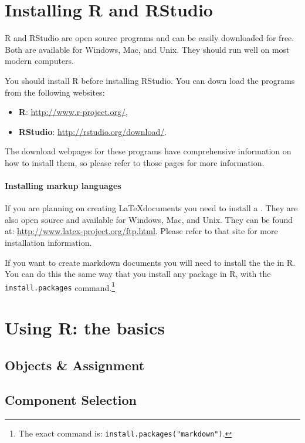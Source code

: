 \documentclass[ChapterTOCs,krantz1]{krantz}\usepackage{graphicx, color}
\begin{document}
\section{Installing R and RStudio}

R and RStudio are open source programs and can be easily downloaded for free. Both are available for Windows, Mac, and Unix. They should run well on most modern computers. 

You should install R before installing RStudio. You can down load the programs from the following websites:

\begin{itemize}
    \item {\bf{R}}: \url{http://www.r-project.org/},
    \item {\bf{RStudio}}: \url{http://rstudio.org/download/}.
\end{itemize}

\noindent The download webpages for these programs have comprehensive information on how to install them, so please refer to those pages for more information.

\paragraph{Installing markup languages}

If you are planning on creating \LaTeX documents you need to install a . They are also open source and available for Windows, Mac, and Unix. They can be found at: \url{http://www.latex-project.org/ftp.html}. Please refer to that site for more installation information.

If you want to create markdown documents you will need to install the the  in R. You can do this the same way that you install any package in R, with the {\tt{install.packages}} command.\footnote{The exact command is: {\tt{install.packages("markdown")}}.} 

\section{Using R: the basics}

\subsection{Objects \& Assignment}

\subsection{Component Selection}
\end{document}
